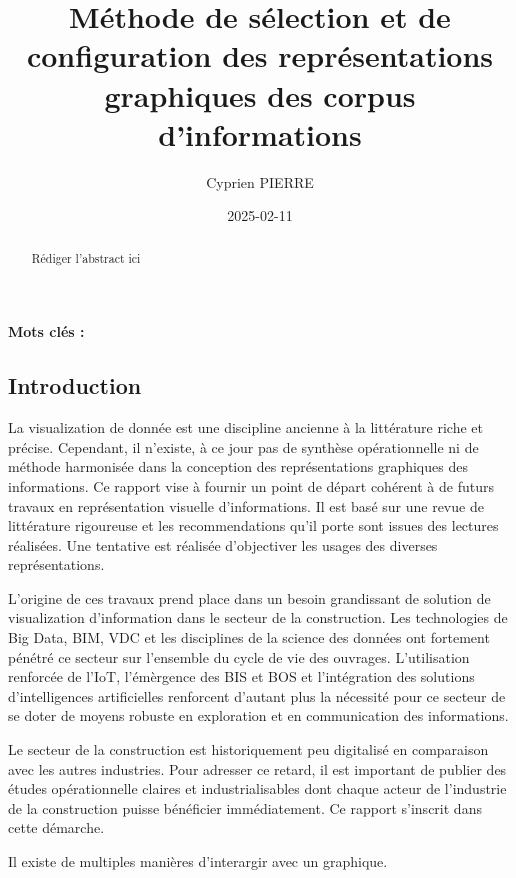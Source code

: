 \documentclass[a4paper,12pt]{article}
\author{Cyprien PIERRE \orcidlink{0009-0009-9040-6795}}
\date{2025-02-11}
\title{Méthode de sélection et de configuration des représentations graphiques des corpus d'informations}
\begin{document}
\maketitle
\begin{abstract}
Rédiger l'abstract ici
\end{abstract}

\renewcommand\{\keywordsname\{\textbf{Mots clés : }

\begin{multicols}{2}
\section*{Introduction}
\label{sec:org939e37b}
La visualization de donnée est une discipline ancienne à la littérature riche et précise. Cependant, il n'existe, à ce jour pas de synthèse opérationnelle ni de méthode harmonisée dans la conception des représentations graphiques des informations. Ce rapport vise à fournir un point de départ cohérent à de futurs travaux en représentation visuelle d'informations. Il est basé sur une revue de littérature rigoureuse et les recommendations qu'il porte sont issues des lectures réalisées. Une tentative est réalisée d'objectiver les usages des diverses représentations.

L'origine de ces travaux prend place dans un besoin grandissant de solution de visualization d'information dans le secteur de la construction. Les technologies de Big Data, BIM, VDC et les disciplines de la science des données ont fortement pénétré ce secteur sur l'ensemble du cycle de vie des ouvrages. \autocite{asiauniversitytaichungtaiwanResearchApplicationFunctiontechnologyaesthetics2020} L'utilisation renforcée de l'IoT, l'émèrgence des BIS et BOS et l'intégration des solutions d'intelligences artificielles renforcent d'autant plus la nécessité pour ce secteur de se doter de moyens robuste en exploration et en communication des informations.

Le secteur de la construction est historiquement peu digitalisé en comparaison avec les autres industries. Pour adresser ce retard, il est important de publier des études opérationnelle claires et industrialisables dont chaque acteur de l'industrie de la construction puisse bénéficier immédiatement. Ce rapport s'inscrit dans cette démarche.

Il existe de multiples manières d'interargir avec un graphique. \autocite{schwabishCenteringAccessibilityData2022a,frankelavskyRightToolsJob2022}


\end{multicols}
\end{document}
